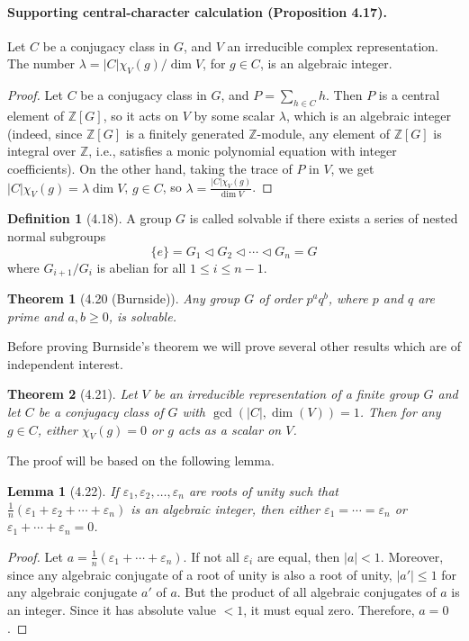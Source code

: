 \documentclass[UTF8,11pt]{ctexart}
\newtheorem*{theorem}{Theorem}
\newtheorem*{lemma}{Lemma}
\theoremstyle{definition}
\newtheorem*{definition}{Definition}
\newcommand{\Z}{\mathbb Z}
\begin{document}
\paragraph{Supporting central-character calculation (Proposition 4.17).}
Let $C$ be a conjugacy class in $G$, and $V$ an irreducible complex representation. The number $\lambda=|C|\chi_V(g)/\dim V$, for $g\in C$, is an algebraic integer.
\begin{proof}
Let $C$ be a conjugacy class in $G$, and $P=\sum_{h\in C}h$. Then $P$ is a central element of $\Z[G]$, so it acts on $V$ by some scalar $\lambda$, which is an algebraic integer (indeed, since $\Z[G]$ is a finitely generated $\Z$-module, any element of $\Z[G]$ is integral over $\Z$, i.e., satisfies a monic polynomial equation with integer coefficients). On the other hand, taking the trace of $P$ in $V$, we get $|C|\chi_V(g)=\lambda\dim V$, $g\in C$, so $\lambda=\frac{|C|\chi_V(g)}{\dim V}$.
\end{proof}
\begin{definition}[4.18]
A group $G$ is called solvable if there exists a series of nested normal subgroups
\[
\{e\}=G_1\triangleleft G_2\triangleleft\cdots\triangleleft G_n=G
\]
where $G_{i+1}/G_i$ is abelian for all $1\leq i\leq n-1$.
\end{definition}
\begin{theorem}[4.20 (Burnside)]
Any group $G$ of order $p^aq^b$, where $p$ and $q$ are prime and $a,b\geq0$, is solvable.
\end{theorem}
Before proving Burnside's theorem we will prove several other results which are of independent interest.
\begin{theorem}[4.21]
Let $V$ be an irreducible representation of a finite group $G$ and let $C$ be a conjugacy class of $G$ with $\gcd(|C|,\dim(V))=1$. Then for any $g\in C$, either $\chi_V(g)=0$ or $g$ acts as a scalar on $V$.
\end{theorem}
The proof will be based on the following lemma.
\begin{lemma}[4.22]
If $\varepsilon_1,\varepsilon_2,\ldots,\varepsilon_n$ are roots of unity such that $\frac1n(\varepsilon_1+\varepsilon_2+\cdots+\varepsilon_n)$ is an algebraic integer, then either $\varepsilon_1=\cdots=\varepsilon_n$ or $\varepsilon_1+\cdots+\varepsilon_n=0$.
\end{lemma}
\begin{proof}
Let $a=\frac1n(\varepsilon_1+\cdots+\varepsilon_n)$. If not all $\varepsilon_i$ are equal, then $|a|<1$. Moreover, since any algebraic conjugate of a root of unity is also a root of unity, $|a'|\leq1$ for any algebraic conjugate $a'$ of $a$. But the product of all algebraic conjugates of $a$ is an integer. Since it has absolute value $<1$, it must equal zero. Therefore, $a=0$.
\end{proof}
\end{document}
